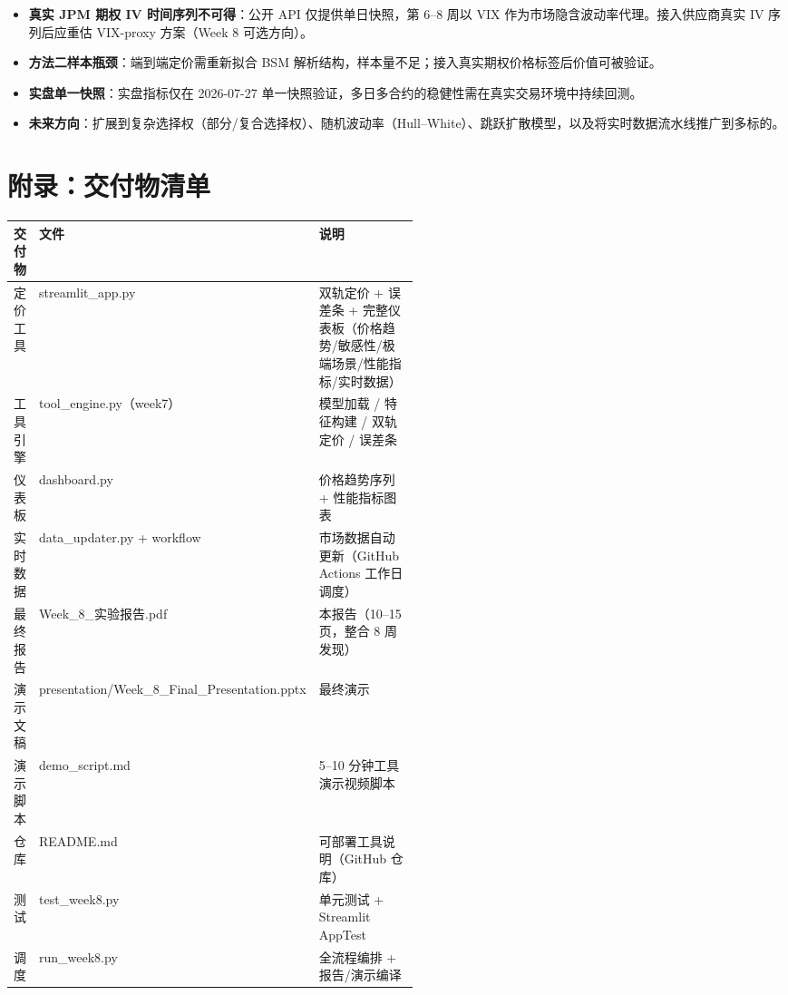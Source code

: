 \documentclass[11pt,a4paper]{article}
\begin{document}
\begin{itemize}
  \item \textbf{真实 JPM 期权 IV 时间序列不可得}：公开 API 仅提供单日快照，第 6--8 周以 VIX 作为市场隐含波动率代理。接入供应商真实 IV 序列后应重估 VIX-proxy 方案（Week 8 可选方向）。
  \item \textbf{方法二样本瓶颈}：端到端定价需重新拟合 BSM 解析结构，样本量不足；接入真实期权价格标签后价值可被验证。
  \item \textbf{实盘单一快照}：实盘指标仅在 2026-07-27 单一快照验证，多日多合约的稳健性需在真实交易环境中持续回测。
  \item \textbf{未来方向}：扩展到复杂选择权（部分/复合选择权）、随机波动率（Hull--White）、跳跃扩散模型，以及将实时数据流水线推广到多标的。
\end{itemize}

\section*{附录：交付物清单}

\begin{center}
\begin{tabular}{@{}llp{0.52\linewidth}@{}}
\toprule
交付物 & 文件 & 说明 \\
\midrule
定价工具 & streamlit\_app.py & 双轨定价 + 误差条 + 完整仪表板（价格趋势/敏感性/极端场景/性能指标/实时数据） \\
工具引擎 & tool\_engine.py（week7） & 模型加载 / 特征构建 / 双轨定价 / 误差条 \\
仪表板 & dashboard.py & 价格趋势序列 + 性能指标图表 \\
实时数据 & data\_updater.py + workflow & 市场数据自动更新（GitHub Actions 工作日调度） \\
最终报告 & Week\_8\_实验报告.pdf & 本报告（10--15 页，整合 8 周发现） \\
演示文稿 & presentation/Week\_8\_Final\_Presentation.pptx & 最终演示 \\
演示脚本 & demo\_script.md & 5--10 分钟工具演示视频脚本 \\
仓库 & README.md & 可部署工具说明（GitHub 仓库） \\
测试 & test\_week8.py & 单元测试 + Streamlit AppTest \\
调度 & run\_week8.py & 全流程编排 + 报告/演示编译 \\
\bottomrule
\end{tabular}
\end{center}
\end{document}
